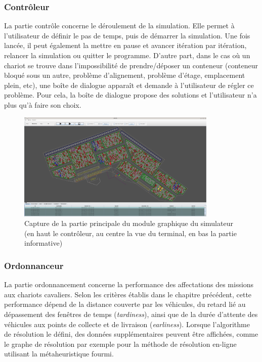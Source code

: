 \subsubsection{Contrôleur}

La partie contrôle concerne le déroulement de la simulation. Elle permet à l'utilisateur de définir le pas de temps, puis de démarrer la simulation. Une fois lancée, il peut également la mettre en pause et avancer itération par itération, relancer la simulation ou quitter le programme. D'autre part, dans le cas où un chariot se trouve dans l'impossibilité de prendre/déposer un conteneur (conteneur bloqué sous un autre, problème d'alignement, problème d'étage, emplacement plein, etc), une boîte de dialogue apparaît et demande à l'utilisateur de régler ce problème. Pour cela, la boîte de dialogue propose des solutions et l'utilisateur n'a plus qu'à faire son choix.

\begin{figure}[h]
\centering
\includegraphics[width=0.85\textwidth]{chapitres/simulation/vue2D-vue-controle-infos.jpg}
\caption{Capture de la partie principale du module graphique du simulateur (en haut le contrôleur, au centre la vue du terminal, en bas la partie informative)}
 \label{fig:simulation:ihm2D}
\end{figure}

\subsubsection{Ordonnanceur}

La partie ordonnancement concerne la performance des affectations des missions aux chariots cavaliers. Selon les critères établis dans le chapitre précédent, cette performance dépend de la distance couverte par les véhicules, du retard lié au dépassement des fenêtres de temps (\textit{tardiness}), ainsi que de la durée d'attente des véhicules aux points de collecte et de livraison (\textit{earliness}). Lorsque l'algorithme de résolution le défini, des données supplémentaires peuvent être affichées, comme le graphe de résolution par exemple pour la méthode de résolution en-ligne utilisant la métaheuristique fourmi.

